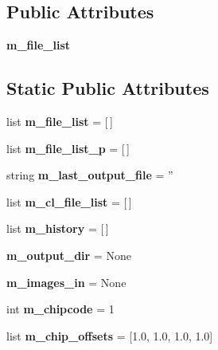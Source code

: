 \subsection*{Public Attributes}
\begin{CompactItemize}
\item 
\textbf{m\_\-file\_\-list}\label{classreduce_1_1reducemod_1_1ReductionBlock_e55eba7175a3628b7de1aa352dbb44bb}

\end{CompactItemize}
\subsection*{Static Public Attributes}
\begin{CompactItemize}
\item 
list \textbf{m\_\-file\_\-list} = [$\,$]\label{classreduce_1_1reducemod_1_1ReductionBlock_f20fac47a6ced7cbd5632b70076eb305}

\item 
list \textbf{m\_\-file\_\-list\_\-p} = [$\,$]\label{classreduce_1_1reducemod_1_1ReductionBlock_1d8ed6e7bb8884f083e20445eaab62cf}

\item 
string \textbf{m\_\-last\_\-output\_\-file} = ''\label{classreduce_1_1reducemod_1_1ReductionBlock_ed0da4ea5b5255885f42c2127d66464a}

\item 
list \textbf{m\_\-cl\_\-file\_\-list} = [$\,$]\label{classreduce_1_1reducemod_1_1ReductionBlock_b93a4404ad3ce840610812ec936d8a67}

\item 
list \textbf{m\_\-history} = [$\,$]\label{classreduce_1_1reducemod_1_1ReductionBlock_2b137de06cfc3491b9b33564c492161c}

\item 
\textbf{m\_\-output\_\-dir} = None\label{classreduce_1_1reducemod_1_1ReductionBlock_197916b78e796237f05a649e742be169}

\item 
\textbf{m\_\-images\_\-in} = None\label{classreduce_1_1reducemod_1_1ReductionBlock_45833fe798e694b12b5bd21e4167b81f}

\item 
int \textbf{m\_\-chipcode} = 1\label{classreduce_1_1reducemod_1_1ReductionBlock_24117f50da2dc3805311927199f38bfc}

\item 
list \textbf{m\_\-chip\_\-offsets} = [1.0, 1.0, 1.0, 1.0]\label{classreduce_1_1reducemod_1_1ReductionBlock_432465cc0a7462b4f8a72e08477fb9e1}


\end{CompactItemize}
